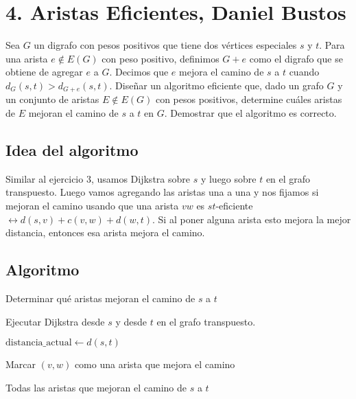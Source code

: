 \documentclass{article}
\begin{document}
\section*{4. Aristas Eficientes, Daniel Bustos}

Sea \( G \) un digrafo con pesos positivos que tiene dos vértices especiales \( s \) y \( t \). Para una arista \( e \notin E(G) \) con peso positivo, definimos \( G + e \) como el digrafo que se obtiene de agregar \( e \) a \( G \). Decimos que \( e \) mejora el camino de \( s \) a \( t \) cuando \( d_G(s, t) > d_{G+e}(s, t) \). Diseñar un algoritmo eficiente que, dado un grafo \( G \) y un conjunto de aristas \( E \notin E(G) \) con pesos positivos, determine cuáles aristas de \( E \) mejoran el camino de \( s \) a \( t \) en \( G \). Demostrar que el algoritmo es correcto.

\subsection*{Idea del algoritmo}

Similar al ejercicio 3, usamos Dijkstra sobre \( s \) y luego sobre \( t \) en el grafo transpuesto. Luego vamos agregando las aristas una a una y nos fijamos si mejoran el camino usando que una arista \( vw \) es \( st \)-eficiente \(\leftrightarrow d(s,v) + c(v,w) + d(w,t)\). Si al poner alguna arista esto mejora la mejor distancia, entonces esa arista mejora el camino.

\subsection*{Algoritmo}

\begin{algorithm}[H]
\caption{Determinar qué aristas mejoran el camino de \( s \) a \( t \)}
\begin{algorithmic}[1]
\STATE Ejecutar Dijkstra desde \( s \) y desde \( t \) en el grafo transpuesto.

\vspace{0.5em}

\STATE $\text{distancia\_actual} \gets d(s, t)$ 

\vspace{0.5em}

    \vspace{0.5em}
        \vspace{0.5em}
        \STATE Marcar \( (v, w) \) como una arista que mejora el camino
        \vspace{0.5em}
    \ENDIF
    \vspace{0.5em}
\ENDFOR

\vspace{0.5em}

\RETURN Todas las aristas que mejoran el camino de \( s \) a \( t \)

\end{algorithmic}
\end{algorithm}
\end{document}
